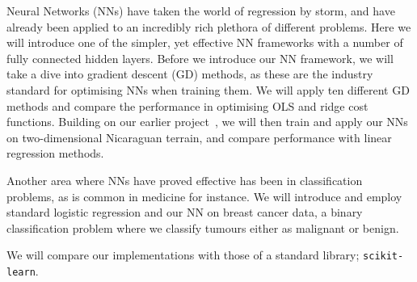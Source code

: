 

Neural Networks (NNs) have taken the world of regression by storm, and have already been applied to an incredibly rich plethora of different problems. Here we will introduce one of the simpler, yet effective NN frameworks with a number of fully connected hidden layers. Before we introduce our NN framework, we will take a dive into gradient descent (GD) methods, as these are the industry standard for optimising NNs when training them. We will apply ten different GD methods and compare the performance in optimising OLS and ridge cost functions. Building on our earlier project~\citep{Project1}, we will then train and apply our NNs on two-dimensional Nicaraguan terrain, and compare performance with linear regression methods.

Another area where NNs have proved effective has been in classification problems, as is common in medicine for instance. We will introduce and employ standard logistic regression and our NN on breast cancer data, a binary classification problem where we classify tumours either as malignant or benign.

We will compare our implementations with those of a standard library; \verb|scikit-learn|.
